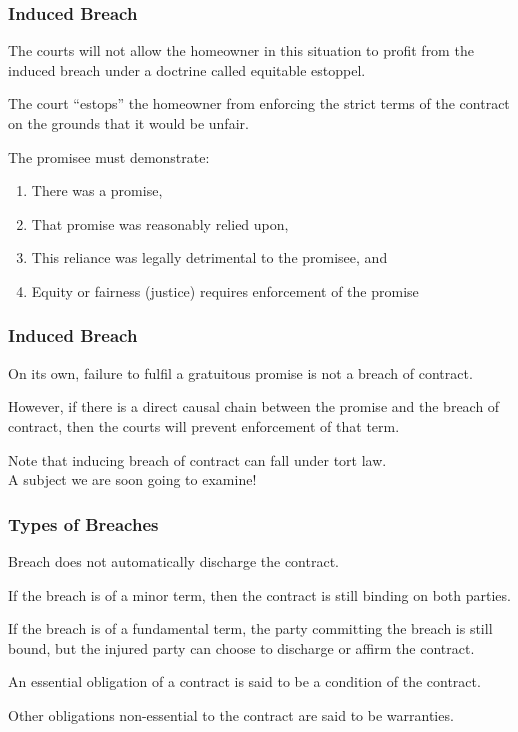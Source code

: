 \begin{frame}
\frametitle{Induced Breach}

The courts will not allow the homeowner in this situation to profit from the induced breach under a doctrine called \alert{equitable estoppel}.

The court ``estops'' the homeowner from enforcing the strict terms of the contract on the grounds that it would be unfair.

The promisee must demonstrate:

\begin{enumerate}
\item There was a promise,
\item That promise was reasonably relied upon,
\item This reliance was legally detrimental to the promisee, and
\item Equity or fairness (justice) requires enforcement of the promise
\end{enumerate}

\end{frame}



\begin{frame}
\frametitle{Induced Breach}

On its own, failure to fulfil a gratuitous promise is not a breach of contract.

However, if there is a direct causal chain between the promise and the breach of contract, then the courts will prevent enforcement of that term.


Note that inducing breach of contract can fall under tort law.\\
\quad A subject we are soon going to examine!

\end{frame}


\begin{frame}
\frametitle{Types of Breaches}

Breach does not automatically discharge the contract.

If the breach is of a minor term, then the contract is still binding on both parties.

If the breach is of a fundamental term, the party committing the breach is still bound, but the injured party can choose to discharge or affirm the contract.

An essential obligation of a contract is said to be a \alert{condition} of the contract.

Other obligations non-essential to the contract are said to be \alert{warranties}.

\end{frame}




